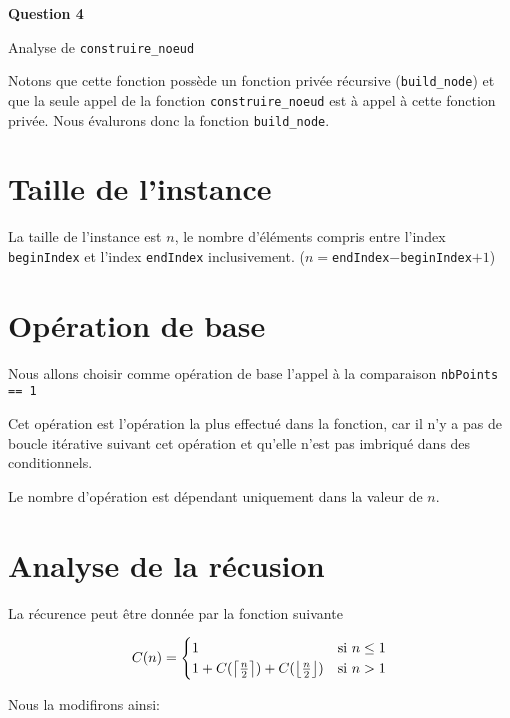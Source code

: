 \documentclass[class=article]{standalone}
\begin{document}
 
\centerline{\Huge \bf Question 4}

\centerline{Analyse de \lstinline{construire_noeud}}

Notons que cette fonction possède un fonction privée récursive (\lstinline{build_node}) 
et que la seule appel de la fonction \lstinline{construire_noeud}
est à appel à cette fonction privée. Nous évalurons donc la fonction \lstinline{build_node}.

\section*{Taille de l'instance}

La taille de l'instance est $n$, le nombre d'éléments compris entre
l'index \lstinline{beginIndex} et l'index \lstinline{endIndex} 
inclusivement. ($n = $\lstinline{endIndex}$-$\lstinline{beginIndex}$+1$)

\section*{Opération de base}

Nous allons choisir comme opération de base l'appel à la comparaison \lstinline{nbPoints == 1}

Cet opération est l'opération la plus effectué dans la fonction, car il n'y a pas de boucle 
itérative suivant cet opération et qu'elle n'est pas imbriqué dans des conditionnels.

Le nombre d'opération est dépendant uniquement dans la valeur de $n$.

\section*{Analyse de la récusion}

La récurence peut être donnée par la fonction suivante

\[
  C(n) =
  \begin{cases}
    1 & \text{si } n \leq 1 \\
    1 + C(\left \lceil \frac{n}{2} \right \rceil) + C(\left \lfloor \frac{n}{2} \right \rfloor)  & \text{si } n > 1 \\
  \end{cases}
\]

Nous la modifirons ainsi:
\end{document}

